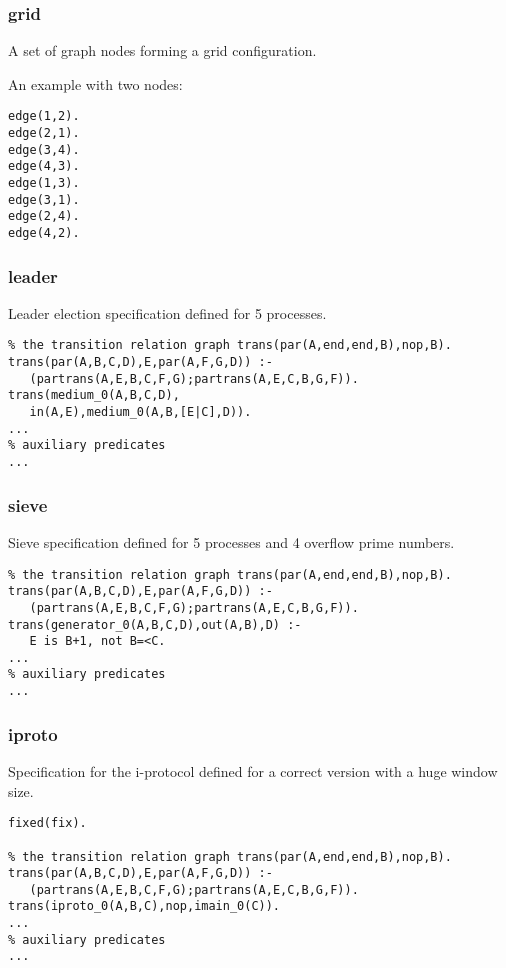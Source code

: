 \subsubsection*{grid}

A set of graph nodes forming a grid configuration.

An example with two nodes:

\begin{Verbatim}
edge(1,2).
edge(2,1).
edge(3,4).
edge(4,3).
edge(1,3).
edge(3,1).
edge(2,4).
edge(4,2).
\end{Verbatim}

\subsubsection*{leader}

Leader election specification defined for 5 processes.

\begin{Verbatim}
% the transition relation graph trans(par(A,end,end,B),nop,B).
trans(par(A,B,C,D),E,par(A,F,G,D)) :-
   (partrans(A,E,B,C,F,G);partrans(A,E,C,B,G,F)).
trans(medium_0(A,B,C,D),
   in(A,E),medium_0(A,B,[E|C],D)).
...
% auxiliary predicates
...
\end{Verbatim}

\subsubsection*{sieve}

Sieve specification defined for 5 processes and 4 overflow prime numbers.

\begin{Verbatim}
% the transition relation graph trans(par(A,end,end,B),nop,B).
trans(par(A,B,C,D),E,par(A,F,G,D)) :-
   (partrans(A,E,B,C,F,G);partrans(A,E,C,B,G,F)).
trans(generator_0(A,B,C,D),out(A,B),D) :-
   E is B+1, not B=<C.
...
% auxiliary predicates
...
\end{Verbatim}

\subsubsection*{iproto}

Specification for the i-protocol defined for a correct version with a huge window size.

\begin{Verbatim}
fixed(fix).

% the transition relation graph trans(par(A,end,end,B),nop,B).
trans(par(A,B,C,D),E,par(A,F,G,D)) :-
   (partrans(A,E,B,C,F,G);partrans(A,E,C,B,G,F)). 
trans(iproto_0(A,B,C),nop,imain_0(C)).
...
% auxiliary predicates
...
\end{Verbatim}